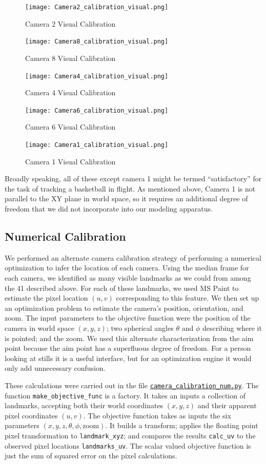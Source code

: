 \documentclass{article}
\begin{document}
\begin{figure}[H]
\texttt{[image: Camera2\_calibration\_visual.png]}
\caption*{Camera 2 Visual Calibration}

\texttt{[image: Camera8\_calibration\_visual.png]}
\caption*{Camera 8 Visual Calibration}
\end{figure}

\begin{figure}[H]
\texttt{[image: Camera4\_calibration\_visual.png]}
\caption*{Camera 4 Visual Calibration}

\texttt{[image: Camera6\_calibration\_visual.png]}
\caption*{Camera 6 Visual Calibration}
\end{figure}

\begin{figure}[H]
\texttt{[image: Camera1\_calibration\_visual.png]}
\caption*{Camera 1 Visual Calibration}
\end{figure}

Broadly speaking, all of these except camera 1 might be termed ``satisfactory''
for the task of tracking a basketball in flight.  
As mentioned above, Camera 1 is not parallel to the XY plane in world space,
so it requires an additional degree of freedom that we did not incorporate into
our modeling apparatus.

\subsection{Numerical Calibration}
We performed an alternate camera calibration strategy of performing a 
numerical optimization to infer the location of each camera.  
Using the median frame for each camera, we identified as many visible landmarks as we could
from among the 41 described above.  
For each of these landmarks, we used MS Paint to estimate the 
pixel location $(u, v)$ corresponding to this feature.  
We then set up an optimization problem to estimate the camera's position, orientation, and zoom.
The input parameters to the objective function were the position of the camera in world space
$(x, y, z)$; two spherical angles $\theta$ and $\phi$ describing where it is pointed; and the zoom.
We used this alternate characterization from the aim point because 
the aim point has a superfluous degree of freedom.  
For a person looking at stills it is a useful interface, but for an optimization engine 
it would only add unnecessary confusion.

These calculations were carried out in the file 
\href{https://github.com/Harvard-AM-205-Basketball/Basketball/blob/master/src/camera_calibration_num.py}
{\texttt{camera\_calibration\_num.py}}.  
The function \texttt{make\_objective\_func} is a factory.  
It takes an inputs a collection of landmarks, accepting both their world coordinates $(x, y, z)$ 
and their apparent pixel coordinates $(u, v)$.  
The objective function takes as inputs the six parameters $(x, y, z, \theta, \phi, \text{zoom})$.
It builds a transform; applies the floating point pixel transformation to \texttt{landmark\_xyz};
and compares the results \texttt{calc\_uv} to the observed pixel locations \texttt{landmarks\_uv}.
The scalar valued objective function is just the sum of squared error on the pixel calculations.
\end{document}
